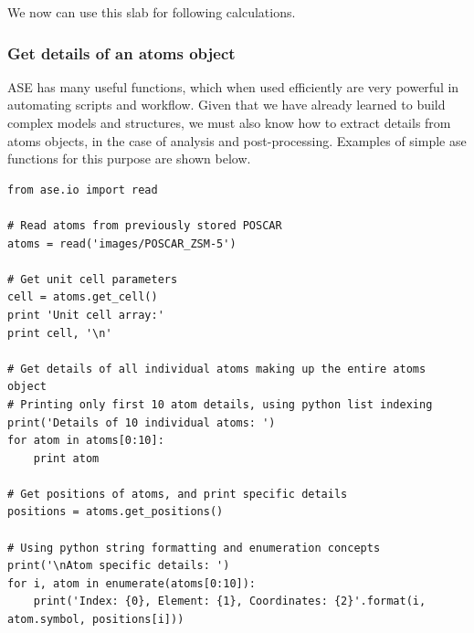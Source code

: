 \documentclass[11pt]{article}
\begin{document}
We now can use this slab for following calculations.  

\subsubsection{Get details of an atoms object}
\label{sec-2-3-6}
ASE has many useful functions, which when used efficiently are very powerful in automating scripts and workflow. Given that we have already learned to build complex models and structures, we must also know how to extract details from atoms objects, in the case of analysis and post-processing. Examples of simple ase functions for this purpose are shown below.
\begin{verbatim}
from ase.io import read

# Read atoms from previously stored POSCAR
atoms = read('images/POSCAR_ZSM-5')

# Get unit cell parameters
cell = atoms.get_cell()
print 'Unit cell array:' 
print cell, '\n'

# Get details of all individual atoms making up the entire atoms object
# Printing only first 10 atom details, using python list indexing
print('Details of 10 individual atoms: ')
for atom in atoms[0:10]:
    print atom

# Get positions of atoms, and print specific details
positions = atoms.get_positions()

# Using python string formatting and enumeration concepts
print('\nAtom specific details: ')
for i, atom in enumerate(atoms[0:10]):
    print('Index: {0}, Element: {1}, Coordinates: {2}'.format(i, atom.symbol, positions[i]))
\end{verbatim}
\end{document}
